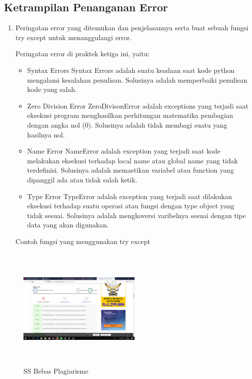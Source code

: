 \subsection{Ketrampilan Penanganan Error}
\begin{enumerate}
	\item Peringatan error yang ditemukan dan penjelasannya serta buat sebuah fungsi try except untuk menanggulangi error.
	
	Peringatan error di praktek ketiga ini, yaitu:
	\begin{itemize}
		\item Syntax Errors
		Syntax Errors adalah suatu keadaan saat kode python mengalami kesalahan penulisan. Solusinya adalah memperbaiki penulisan kode yang salah.
		
		\item Zero Division Error
		ZeroDivisonError adalah exceptions yang terjadi saat eksekusi program menghasilkan perhitungan matematika pembagian dengan angka nol (0). Solusinya adalah tidak membagi suatu yang hasilnya nol.
		
		\item Name Error
		NameError adalah exception yang terjadi saat kode melakukan eksekusi terhadap local name atau global name yang tidak terdefinisi. Solusinya adalah memastikan variabel atau function yang dipanggil ada atau tidak salah ketik.
		
		\item Type Error
		TypeError adalah exception yang terjadi saat dilakukan eksekusi terhadap suatu operasi atau fungsi dengan type object yang tidak sesuai. Solusinya adalah mengkoversi varibelnya sesuai dengan tipe data yang akan digunakan.
	\end{itemize}
	
	Contoh fungsi yang menggunakan try except
	
\end{enumerate}

\begin{figure}[H]
\centering
\includegraphics[width=6cm,height=6cm]{figures/habib.png}
\caption{SS Bebas Plagiarisme}
\label{habib}
\end{figure}